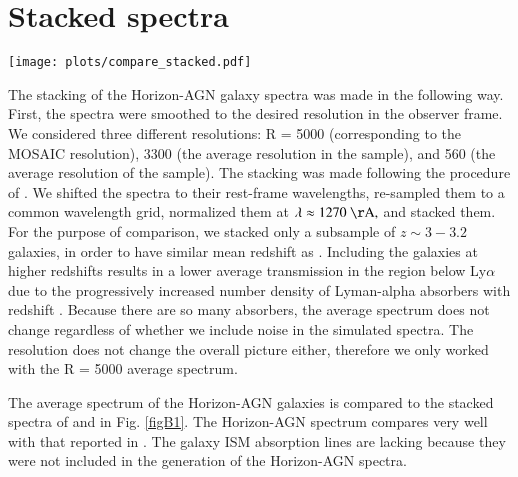 \documentclass{aa}
\newcommand{\lya}{Ly$\alpha$}
\begin{document}
{{{{{{{{{{{{{{\appendix

\section{Stacked spectra}
\label{stacked}
\renewcommand{\thefigure}{A.\arabic{figure}}
\setcounter{figure}{0}

\begin{figure*}[!t]
\begin{center}
\texttt{[image: plots/compare\_stacked.pdf]}
\caption{Stacked rest-frame spectra of galaxies generated in the Horizon-AGN simulation compared to the stacked spectra of 811 galaxies at $2.4 < z < 3.5$ of \citet{Shapley2003} and to 14 galaxies at $1.6 < z < 3.6$ of \citet{Rigby18}.}
\label{figB1}
\end{center}
\end{figure*}

The stacking of the Horizon-AGN galaxy spectra was made in the following way. First, the spectra were smoothed to the desired resolution in the observer frame. We considered three different resolutions: R = 5000 (corresponding to the MOSAIC resolution), 3300 (the average resolution in the \citet{Rigby18} sample), and 560 (the average resolution of the \citet{Shapley2003} sample). The stacking was made following the procedure of \citet{Rigby18}. We shifted the spectra to their rest-frame wavelengths, re-sampled them to a common wavelength grid, normalized them at $\lambda \approx 1270~\mathrm{\AA,}$ and stacked them. For the purpose of comparison, we stacked only a subsample of $z \sim 3 - 3.2$ galaxies, in order to have similar mean redshift as \citet{Shapley2003}. Including the galaxies at higher redshifts results in a lower average transmission in the region below  \lya\,due to the progressively increased number density of Lyman-alpha absorbers with redshift \citep[e.g.][]{Kim2001}. Because there are so many absorbers, the average spectrum does not change regardless of whether we include noise in the simulated spectra. The resolution does not change the overall picture either, therefore we only worked with the R = 5000 average spectrum.

The average spectrum of the Horizon-AGN galaxies is compared to the stacked spectra of \citet{Shapley2003} and \citet{Rigby18} in Fig. \ref{figB1}. The Horizon-AGN spectrum compares very well with that reported in \citet{Shapley2003}. The galaxy ISM absorption lines are lacking because they were not included in the generation of the Horizon-AGN spectra.

}}}}}}}}}}}}}}
\end{document}
